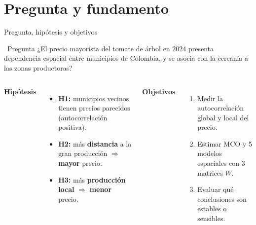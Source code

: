 \documentclass[aspectratio=169,11pt]{beamer}
\begin{document}
\section{Pregunta y fundamento}
\begin{frame}{Pregunta, hipótesis y objetivos}
  \begin{alertblock}{\faQuestionCircle\ Pregunta}
    ¿El precio mayorista del tomate de árbol en 2024 presenta dependencia espacial entre
    municipios de Colombia, y se asocia con la cercanía a las zonas productoras?
  \end{alertblock}
  \vspace{0.15cm}
  \begin{columns}[T]
    \textbf{\color{hoja}Hipótesis}
    \begin{itemize}\small
      \item \textbf{H1:} municipios vecinos tienen precios parecidos (autocorrelación positiva).
      \item \textbf{H2:} más \textbf{distancia} a la gran producción $\Rightarrow$ \textbf{mayor} precio.
      \item \textbf{H3:} más \textbf{producción local} $\Rightarrow$ \textbf{menor} precio.
    \end{itemize}
    \textbf{\color{hoja}Objetivos}
    \begin{enumerate}\small
      \item Medir la autocorrelación global y local del precio.
      \item Estimar MCO y 5 modelos espaciales con 3 matrices $W$.
      \item Evaluar qué conclusiones son estables o sensibles.
    \end{enumerate}
  \end{columns}
\end{frame}
\end{document}
